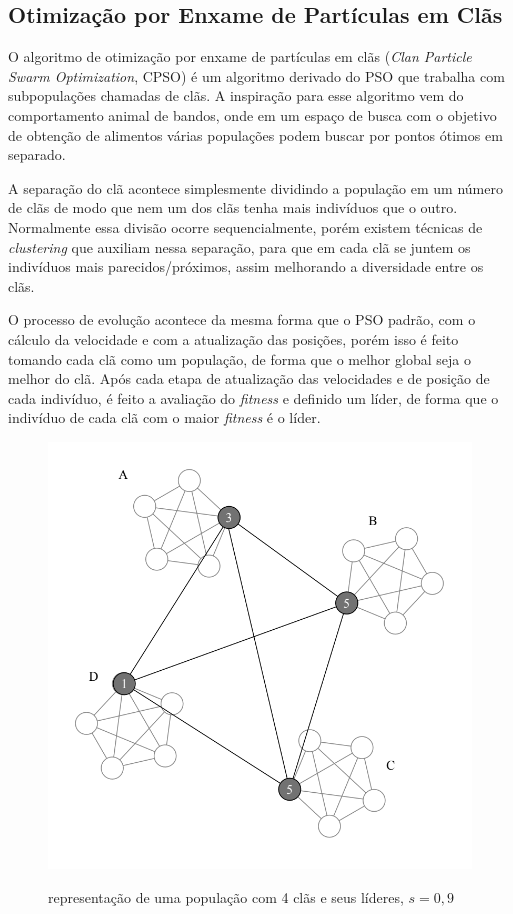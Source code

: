 \subsection{Otimização por Enxame de Partículas em Clãs}

O algoritmo de otimização por enxame de partículas em clãs (\textit{Clan Particle Swarm Optimization}, CPSO) é um algoritmo derivado do PSO que trabalha com subpopulações chamadas de clãs. A inspiração para esse algoritmo vem do comportamento animal de bandos, onde em um espaço de busca com o objetivo de obtenção de alimentos várias populações podem buscar por pontos ótimos em separado.

A separação do clã acontece simplesmente dividindo a população em um número de clãs de modo que nem um dos clãs tenha mais indivíduos que o outro. Normalmente essa divisão ocorre sequencialmente, porém existem técnicas de \textit{clustering} que auxiliam nessa separação, para que em cada clã se juntem os indivíduos mais parecidos/próximos, assim melhorando a diversidade entre os clãs.

O processo de evolução acontece da mesma forma que o PSO padrão, com o cálculo da velocidade e com a atualização das posições, porém isso é feito tomando cada clã como um população, de forma que o melhor global seja o melhor do clã. Após cada etapa de atualização das velocidades e de posição de cada indivíduo, é feito a avaliação do \textit{fitness} e definido um líder, de forma que o indivíduo de cada clã com o maior \textit{fitness} é o líder.

\begin{figure}[!htb]
	\caption{representação de uma população com 4 clãs e seus líderes, $ s = 0,9 $}
	\centering
	\includegraphics[scale=0.6]{images/cpso_leader_conference.png}
	\label{fig:cpso_leader_conference}
\end{figure}

